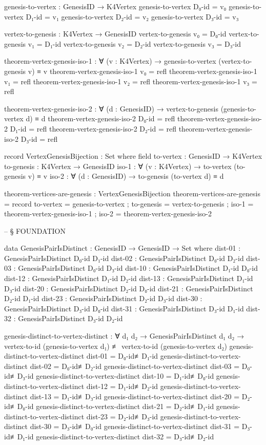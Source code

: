 \documentclass[11pt,a4paper]{book}
\begin{document}
\begin{code}
genesis-to-vertex : GenesisID → K4Vertex
genesis-to-vertex D₀-id = v₀
genesis-to-vertex D₁-id = v₁
genesis-to-vertex D₂-id = v₂
genesis-to-vertex D₃-id = v₃

vertex-to-genesis : K4Vertex → GenesisID
vertex-to-genesis v₀ = D₀-id
vertex-to-genesis v₁ = D₁-id
vertex-to-genesis v₂ = D₂-id
vertex-to-genesis v₃ = D₃-id

theorem-vertex-genesis-iso-1 : ∀ (v : K4Vertex) → genesis-to-vertex (vertex-to-genesis v) ≡ v
theorem-vertex-genesis-iso-1 v₀ = refl
theorem-vertex-genesis-iso-1 v₁ = refl
theorem-vertex-genesis-iso-1 v₂ = refl
theorem-vertex-genesis-iso-1 v₃ = refl

theorem-vertex-genesis-iso-2 : ∀ (d : GenesisID) → vertex-to-genesis (genesis-to-vertex d) ≡ d
theorem-vertex-genesis-iso-2 D₀-id = refl
theorem-vertex-genesis-iso-2 D₁-id = refl
theorem-vertex-genesis-iso-2 D₂-id = refl
theorem-vertex-genesis-iso-2 D₃-id = refl

record VertexGenesisBijection : Set where
  field
    to-vertex : GenesisID → K4Vertex
    to-genesis : K4Vertex → GenesisID
    iso-1 : ∀ (v : K4Vertex) → to-vertex (to-genesis v) ≡ v
    iso-2 : ∀ (d : GenesisID) → to-genesis (to-vertex d) ≡ d

theorem-vertices-are-genesis : VertexGenesisBijection
theorem-vertices-are-genesis = record
  { to-vertex = genesis-to-vertex
  ; to-genesis = vertex-to-genesis
  ; iso-1 = theorem-vertex-genesis-iso-1
  ; iso-2 = theorem-vertex-genesis-iso-2
  }


-- § FOUNDATION

data GenesisPairIsDistinct : GenesisID → GenesisID → Set where
  dist-01 : GenesisPairIsDistinct D₀-id D₁-id
  dist-02 : GenesisPairIsDistinct D₀-id D₂-id
  dist-03 : GenesisPairIsDistinct D₀-id D₃-id
  dist-10 : GenesisPairIsDistinct D₁-id D₀-id
  dist-12 : GenesisPairIsDistinct D₁-id D₂-id
  dist-13 : GenesisPairIsDistinct D₁-id D₃-id
  dist-20 : GenesisPairIsDistinct D₂-id D₀-id
  dist-21 : GenesisPairIsDistinct D₂-id D₁-id
  dist-23 : GenesisPairIsDistinct D₂-id D₃-id
  dist-30 : GenesisPairIsDistinct D₃-id D₀-id
  dist-31 : GenesisPairIsDistinct D₃-id D₁-id
  dist-32 : GenesisPairIsDistinct D₃-id D₂-id

genesis-distinct-to-vertex-distinct : ∀ {d₁ d₂} → GenesisPairIsDistinct d₁ d₂ → 
  vertex-to-id (genesis-to-vertex d₁) ≢ vertex-to-id (genesis-to-vertex d₂)
genesis-distinct-to-vertex-distinct dist-01 = D₀-id≢D₁-id
genesis-distinct-to-vertex-distinct dist-02 = D₀-id≢D₂-id
genesis-distinct-to-vertex-distinct dist-03 = D₀-id≢D₃-id
genesis-distinct-to-vertex-distinct dist-10 = D₁-id≢D₀-id
genesis-distinct-to-vertex-distinct dist-12 = D₁-id≢D₂-id
genesis-distinct-to-vertex-distinct dist-13 = D₁-id≢D₃-id
genesis-distinct-to-vertex-distinct dist-20 = D₂-id≢D₀-id
genesis-distinct-to-vertex-distinct dist-21 = D₂-id≢D₁-id
genesis-distinct-to-vertex-distinct dist-23 = D₂-id≢D₃-id
genesis-distinct-to-vertex-distinct dist-30 = D₃-id≢D₀-id
genesis-distinct-to-vertex-distinct dist-31 = D₃-id≢D₁-id
genesis-distinct-to-vertex-distinct dist-32 = D₃-id≢D₂-id


\end{code}
\end{document}
